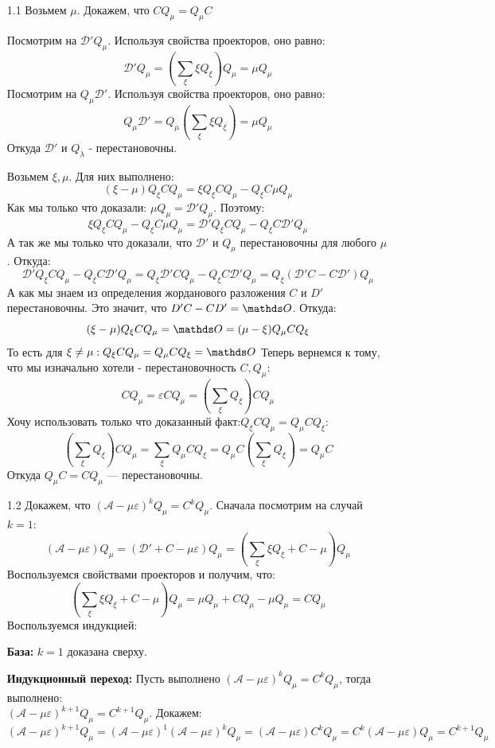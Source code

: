 \begin{enumerate}
    \item[1.1]  Возьмем $ \mu$. Докажем, что $CQ_{\mu}=Q_{\mu}C$

    Посмотрим на $\mathcal{D}'Q_{\mu}$. Используя свойства проекторов, оно равно:
    $$\mathcal{D}'Q_{\mu}= \left(\sum\limits_{\xi}\xi Q_\xi\right) Q_{\mu } = \mu Q_{\mu}$$
     Посмотрим на $Q_{\mu}\mathcal{D}'$. Используя свойства проекторов, оно равно:
    $$Q_{\mu}\mathcal{D}'= Q_{\mu }\left(\sum\limits_{\xi}\xi Q_\xi\right)  = \mu Q_{\mu}$$
    Откуда $\mathcal{D}'$ и $Q_{\lambda}$ - перестановочны.

    Возьмем $\xi, \mu$. Для них выполнено:
    $$(\xi-\mu)Q_{\xi} CQ_{\mu} = \xi Q_{\xi}CQ_{\mu}-Q_{\xi}C\mu Q_{\mu}$$
    Как мы только что доказали: $\mu Q_{\mu}=\mathcal{D}'Q_{\mu}$. Поэтому:
    $$\xi Q_{\xi}CQ_{\mu}-Q_{\xi}C\mu Q_{\mu} = \mathcal{D}' Q_{\xi}CQ_{\mu}-Q_{\xi}C\mathcal{D}'Q_{\mu}$$
    А так же мы только что доказали, что $\mathcal{D}'$ и $Q_{\mu}$ перестановочны для любого $\mu$. Откуда:
    $$\mathcal{D}' Q_{\xi}CQ_{\mu}-Q_{\xi}C\mathcal{D}'Q_{\mu} =  Q_{\xi}\mathcal{D}'CQ_{\mu}-Q_{\xi}C\mathcal{D}'Q_{\mu} = Q_{\xi}(\mathcal{D}'C - C\mathcal{D}
    ')Q_{\mu}$$
    А как мы знаем из определения жорданового разложения $C$ и $D'$ перестановочны. Это значит, что $D'C-CD' = \zero$. Откуда:
    $$(\xi-\mu)Q_{\xi} CQ_{\mu} = \zero = (\mu-\xi)Q_{\mu} CQ_{\xi}$$
    То есть для $\xi\neq \mu: Q_{\xi} CQ_{\mu} = Q_{\mu} CQ_{\xi} = \zero$
    Теперь вернемся к тому, что мы изначально хотели - перестановочность $C,Q_{\mu} $:
    $$CQ_{\mu} = \varepsilon C Q_{\mu } = \left(\sum\limits_{\xi}Q_{\xi}\right)CQ_{\mu}$$
    Хочу использовать только что доказанный факт:$Q_{\xi} CQ_{\mu} = Q_{\mu} CQ_{\xi}$:
    $$\left(\sum\limits_{\xi}Q_{\xi}\right)CQ_{\mu}  = \sum\limits_{\xi}Q_{\mu}CQ_{\xi}=Q_{\mu}C \left(\sum\limits_{\xi}Q_{\xi}\right)= Q_{\mu}C$$
    Откуда $Q_{\mu}C = C Q_{\mu}$ --- перестановочны.
    \item[1.2] Докажем, что $(\mathcal{A-\mu\varepsilon})^kQ_{\mu} = C^kQ_{\mu}$.
    Сначала посмотрим на случай $k=1$:
    $$(\mathcal{A-\mu\varepsilon})Q_{\mu} = (\mathcal{D}'+C - \mu \varepsilon)Q_{\mu}=(\sum\limits_{\xi}\xi Q_{\xi} + C  - \mu )Q_{\mu}$$
    Воспользуемся свойствами проекторов и получим, что:
    $$(\sum\limits_{\xi}\xi Q_{\xi} + C  - \mu)Q_{\mu} = \mu Q_{\mu} + C Q_{\mu}- \mu Q_{\mu}= CQ_{\mu}$$
    Воспользуемся индукцией:

    \textbf{База:} $k=1$ доказана сверху.

    \textbf{Индукционный переход:} Пусть выполнено $(\mathcal{A-\mu\varepsilon})^kQ_{\mu} = C^kQ_{\mu}$,  тогда выполнено:\\
    $(\mathcal{A-\mu\varepsilon})^{k+1}Q_{\mu} = C^{k+1}Q_{\mu}$. Докажем:
    $$(\mathcal{A-\mu\varepsilon})^{k+1}Q_{\mu}  = (\mathcal{A-\mu\varepsilon})^{1}(\mathcal{A-\mu\varepsilon})^{k}Q_{\mu} = (\mathcal{A-\mu\varepsilon}) C^kQ_{\mu} = C^k(\mathcal{A-\mu\varepsilon})Q_{\mu} = C^{k+1}Q_{\mu}$$


\end{enumerate}

